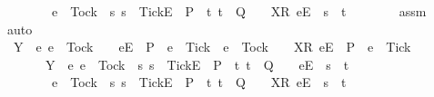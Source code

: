 \begin{isabellebody}
\ \ \ \ \ \ \ \ e\ {\isacharequal}\ Tock\ {\isasymand}\ {\isacharparenleft}{\isasymexists}s{\isachardot}\ s\ {\isacharat}\ {\isacharbrackleft}{\isacharbrackleft}Tick{\isacharbrackright}\isactrlsub E{\isacharbrackright}\ {\isasymin}\ P\ {\isasymand}\ {\isacharparenleft}{\isasymexists}t{\isachardot}\ t\ {\isasymin}\ Q\ {\isasymand}\ {\isasymrho}\ {\isacharat}\ {\isacharbrackleft}{\isacharbrackleft}X{\isacharbrackright}\isactrlsub R{\isacharcomma}\ {\isacharbrackleft}e{\isacharbrackright}\isactrlsub E{\isacharbrackright}\ {\isacharequal}\ s\ {\isacharat}\ t{\isacharparenright}{\isacharparenright}{\isacharbraceright}{\isacharparenright}\ {\isacharequal}\ {\isacharbraceleft}{\isacharbraceright}{\isachardoublequoteclose}\isanewline
\ \ \ \ \isamarkupfalse%
\ assm{}\ \isamarkupfalse%
\ auto\isanewline
\ \ \isamarkupfalse%
\ \isamarkupfalse%
\ {}{\isacharcolon}\ {\isachardoublequoteopen}{\isacharparenleft}Y\ {\isasyminter}\ {\isacharbraceleft}e{\isachardot}\ e\ {\isasymnoteq}\ Tock\ {\isasymand}\ {\isasymrho}\ {\isacharat}\ {\isacharbrackleft}{\isacharbrackleft}e{\isacharbrackright}\isactrlsub E{\isacharbrackright}\ {\isasymin}\ P\ {\isasymand}\ e\ {\isasymnoteq}\ Tick\ {\isasymor}\ e\ {\isacharequal}\ Tock\ {\isasymand}\ {\isasymrho}\ {\isacharat}\ {\isacharbrackleft}{\isacharbrackleft}X{\isacharbrackright}\isactrlsub R{\isacharcomma}\ {\isacharbrackleft}e{\isacharbrackright}\isactrlsub E{\isacharbrackright}\ {\isasymin}\ P\ {\isasymand}\ e\ {\isasymnoteq}\ Tick{\isacharbraceright}{\isacharparenright}\isanewline
\ \ \ \ \ \ {\isasymunion}\ {\isacharparenleft}Y\ {\isasyminter}\ {\isacharbraceleft}e{\isachardot}\ e\ {\isasymnoteq}\ Tock\ {\isasymand}\ {\isacharparenleft}{\isasymexists}s{\isachardot}\ s\ {\isacharat}\ {\isacharbrackleft}{\isacharbrackleft}Tick{\isacharbrackright}\isactrlsub E{\isacharbrackright}\ {\isasymin}\ P\ {\isasymand}\ {\isacharparenleft}{\isasymexists}t{\isachardot}\ t\ {\isasymin}\ Q\ {\isasymand}\ {\isasymrho}\ {\isacharat}\ {\isacharbrackleft}{\isacharbrackleft}e{\isacharbrackright}\isactrlsub E{\isacharbrackright}\ {\isacharequal}\ s\ {\isacharat}\ t{\isacharparenright}{\isacharparenright}\ {\isasymor}\isanewline
\ \ \ \ \ \ \ \ e\ {\isacharequal}\ Tock\ {\isasymand}\ {\isacharparenleft}{\isasymexists}s{\isachardot}\ s\ {\isacharat}\ {\isacharbrackleft}{\isacharbrackleft}Tick{\isacharbrackright}\isactrlsub E{\isacharbrackright}\ {\isasymin}\ P\ {\isasymand}\ {\isacharparenleft}{\isasymexists}t{\isachardot}\ t\ {\isasymin}\ Q\ {\isasymand}\ {\isasymrho}\ {\isacharat}\ {\isacharbrackleft}{\isacharbrackleft}X{\isacharbrackright}\isactrlsub R{\isacharcomma}\ {\isacharbrackleft}e{\isacharbrackright}\isactrlsub E{\isacharbrackright}\ {\isacharequal}\ s\ {\isacharat}\ t{\isacharparenright}{\isacharparenright}{\isacharbraceright}{\isacharparenright}\ {\isacharequal}\ {\isacharbraceleft}{\isacharbraceright}{\isachardoublequoteclose}\isanewline

\end{isabellebody}
